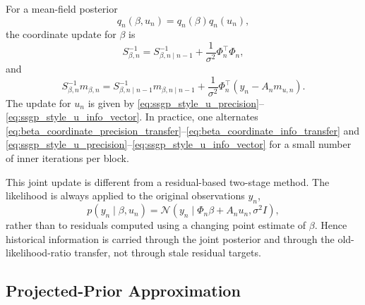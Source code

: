 \documentclass[12pt]{article}
\begin{document}
For a mean-field posterior
\begin{equation}
    q_n(\beta,u_n)=q_n(\beta)q_n(u_n),
\end{equation}
the coordinate update for \(\beta\) is
\begin{equation}
    S_{\beta,n}^{-1}
    =
    S_{\beta,n\mid n-1}^{-1}
    +
    \frac{1}{\sigma^2}\Phi_n^\top\Phi_n,
    \label{eq:beta_coordinate_precision_transfer}
\end{equation}
and
\begin{equation}
    S_{\beta,n}^{-1}m_{\beta,n}
    =
    S_{\beta,n\mid n-1}^{-1}m_{\beta,n\mid n-1}
    +
    \frac{1}{\sigma^2}
    \Phi_n^\top
    \left(
        y_n-A_nm_{u,n}
    \right).
    \label{eq:beta_coordinate_info_transfer}
\end{equation}
The update for \(u_n\) is given by
\eqref{eq:ssgp_style_u_precision}--\eqref{eq:ssgp_style_u_info_vector}. In practice,
one alternates
\eqref{eq:beta_coordinate_precision_transfer}--\eqref{eq:beta_coordinate_info_transfer}
and \eqref{eq:ssgp_style_u_precision}--\eqref{eq:ssgp_style_u_info_vector} for a
small number of inner iterations per block.

This joint update is different from a residual-based two-stage method. The likelihood is
always applied to the original observations \(y_n\),
\begin{equation}
    p(y_n\mid \beta,u_n)
    =
    \mathcal{N}
    \left(
        y_n
        \mid
        \Phi_n\beta + A_nu_n,
        \sigma^2I
    \right),
\end{equation}
rather than to residuals computed using a changing point estimate of \(\beta\). Hence
historical information is carried through the joint posterior and through the
old-likelihood-ratio transfer, not through stale residual targets.

\subsection{Projected-Prior Approximation}
\label{subsec:projected_prior_approximation}
\end{document}
